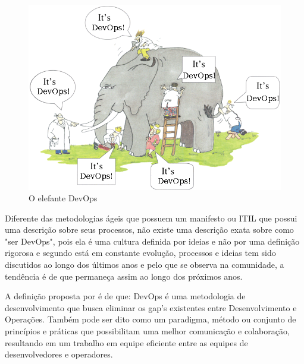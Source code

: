 \documentclass[twoside,english,brazilian]{UNISINOSartigo}
\begin{document}
\begin{figure}[h]
    \centering
    \includegraphics[scale=.5]{imagens/devops_elefant.png}
    \caption{O elefante DevOps}
    \label{fig:elefante DevOps}
\end{figure}


Diferente das metodologias ágeis que possuem um manifesto ou ITIL que possui uma descrição sobre seus processos, não existe uma descrição exata sobre como "ser DevOps", pois ela é uma cultura definida por ideias e não por uma definição rigorosa e segundo  está em constante evolução, processos e ideias tem sido discutidos ao longo dos últimos anos e pelo que se observa na comunidade, a tendência é de que permaneça assim ao longo dos próximos anos.  \newline 


A definição proposta por  é de que: DevOps é uma metodologia de desenvolvimento que busca eliminar os gap's existentes entre Desenvolvimento e Operações. Também pode ser dito como um paradigma, método ou conjunto de princípios e práticas que possibilitam uma melhor comunicação e colaboração, resultando em um trabalho em equipe eficiente entre as equipes de desenvolvedores e operadores.
\end{document}
